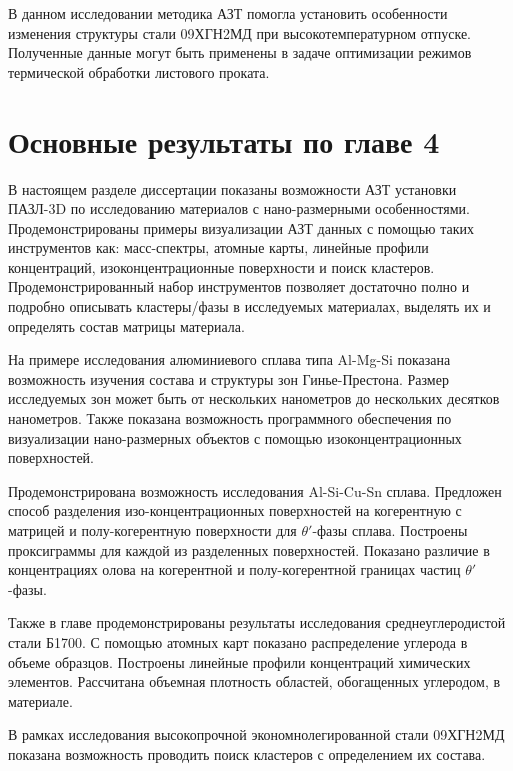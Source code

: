 В данном исследовании методика АЗТ помогла установить особенности изменения структуры стали 09ХГН2МД при высокотемпературном отпуске. Полученные данные могут быть применены в задаче оптимизации режимов термической обработки листового проката.

\FloatBarrier

\clearpage
\section{Основные результаты по главе 4}\label{sec:ch4/sect5}


В настоящем разделе диссертации показаны возможности АЗТ установки ПАЗЛ-3D по исследованию материалов с нано-размерными особенностями. Продемонстрированы примеры визуализации АЗТ данных с помощью таких инструментов как: масс-спектры, атомные карты, линейные профили концентраций, изоконцентрационные поверхности и поиск кластеров. Продемонстрированный набор инструментов позволяет достаточно полно и подробно описывать кластеры/фазы в исследуемых материалах, выделять их и определять состав матрицы материала.

На примере исследования алюминиевого сплава типа Al-Mg-Si показана возможность изучения состава и структуры зон Гинье-Престона. Размер исследуемых зон может быть от нескольких нанометров до нескольких десятков нанометров. Также показана возможность программного обеспечения по визуализации нано-размерных объектов с помощью изоконцентрационных поверхностей.

Продемонстрирована возможность исследования Al-Si-Cu-Sn сплава. Предложен способ разделения изо-концентрационных поверхностей на когерентную с матрицей и полу-когерентную поверхности для $\theta '$-фазы сплава. Построены проксиграммы для каждой из разделенных поверхностей. Показано различие в концентрациях олова на когерентной и полу-когерентной границах частиц $\theta '$-фазы.

Также в главе продемонстрированы результаты исследования среднеуглеродистой стали Б1700. С помощью атомных карт показано распределение углерода в объеме образцов. Построены линейные профили концентраций химических элементов. Рассчитана объемная плотность областей, обогащенных углеродом, в материале.

В рамках исследования высокопрочной экономнолегированной стали 09ХГН2МД показана возможность проводить поиск кластеров с определением их состава.






\FloatBarrier
\clearpage


















